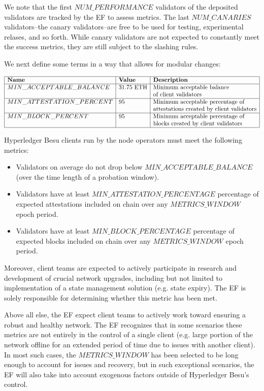 We note that the first $NUM\_PERFORMANCE$ validators of the deposited validators are tracked by the EF to assess metrics.  The last $NUM\_CANARIES$ validators--the canary validators--are free to be used for testing, experimental relases, and so forth.  While canary validators are not expected to constantly meet the success metrics, they are still subject to the slashing rules.

We next define some terms in a way that allows for modular changes:

\[
\begin{array}{|l|l|l|}
\hline
\textbf{Name} & \textbf{Value} & \textbf{Description} \\
\hline
MIN\_ACCEPTABLE\_BALANCE & 31.75 \text{ ETH} & \text{Minimum acceptable balance} \\
& & \text{of client validators} \\
\hline
MIN\_ATTESTATION\_PERCENT & 95 & \text{Minimum acceptable percentage of} \\
& & \text{attestations created by client validators} \\
\hline
MIN\_BLOCK\_PERCENT & 95 & \text{Minimum acceptable percentage of} \\
& & \text{blocks created by client validators} \\
\hline
\end{array}
\]

Hyperledger Besu clients run by the node operators must meet the following metrics:
\begin{itemize}
\item Validators on average do not drop below $MIN\_ACCEPTABLE\_BALANCE$ (over the time length of a probation window).
\item Validators have at least $MIN\_ATTESTATION\_PERCENTAGE$ percentage of expected attestations included on chain over any $METRICS\_WINDOW$ epoch period.
\item Validators have at least $MIN\_BLOCK\_PERCENTAGE$ percentage of expected blocks included on chain over any $METRICS\_WINDOW$ epoch period.
\end{itemize}

Moreover, client teams are expected to actively participate in research and development of crucial network upgrades, including but not limited to implementation of a state management solution (e.g. state expiry). The EF is solely responsible for determining whether this metric has been met.

Above all else, the EF expect client teams to actively work toward ensuring a robust and healthy network. The EF recognizes that in some scenarios these metrics are not entirely in the control of a single client (e.g. large portion of the network offline for an extended period of time due to issues with another client). In most such cases, the $METRICS\_WINDOW$ has been selected to be long enough to account for issues and recovery, but in such exceptional scenarios, the EF will also take into account exogenous factors outside of Hyperledger Besu’s control.

